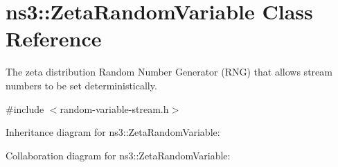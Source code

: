 \hypertarget{classns3_1_1ZetaRandomVariable}{}\section{ns3\+:\+:Zeta\+Random\+Variable Class Reference}
\label{classns3_1_1ZetaRandomVariable}


The zeta distribution Random Number Generator (R\+NG) that allows stream numbers to be set deterministically.  




{\ttfamily \#include $<$random-\/variable-\/stream.\+h$>$}



Inheritance diagram for ns3\+:\+:Zeta\+Random\+Variable\+:


Collaboration diagram for ns3\+:\+:Zeta\+Random\+Variable\+:
